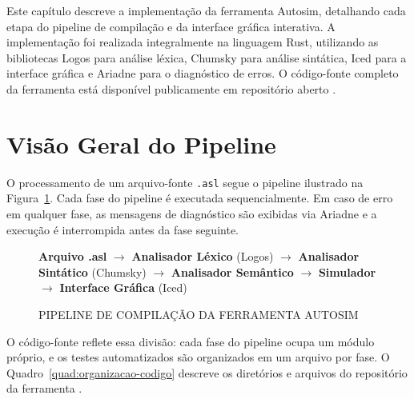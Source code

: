\documentclass[
    12pt
    ,oneside
    ,a4paper
    ,chapter=TITLE
    ,section=TITLE
    ,sumario=abnt-6027-2012]{abntex2}
\begin{document}
Este capítulo descreve a implementação da ferramenta Autosim, detalhando cada etapa do
pipeline de compilação e da interface gráfica interativa. A implementação foi realizada
integralmente na linguagem Rust, utilizando as bibliotecas Logos \cite{logos2021} para
análise léxica, Chumsky \cite{chumsky2022} para análise sintática, Iced \cite{iced2022}
para a interface gráfica e Ariadne \cite{ariadne2021} para o diagnóstico de erros. O código-fonte completo
da ferramenta está disponível publicamente em repositório aberto \cite{autosim2026}.

\section{Visão Geral do Pipeline}
\label{sec:impl-pipeline}

O processamento de um arquivo-fonte \texttt{.asl} segue o pipeline ilustrado na
Figura~\ref{fig:pipeline-autosim}. Cada fase do pipeline é executada sequencialmente.
Em caso de erro em qualquer fase, as mensagens de diagnóstico são exibidas via
Ariadne e a execução é interrompida antes da fase seguinte.

\begin{figure}[h]
    \centering
    \caption{PIPELINE DE COMPILAÇÃO DA FERRAMENTA AUTOSIM}
    \label{fig:pipeline-autosim}
    \textbf{Arquivo .asl} $\to$ \textbf{Analisador Léxico} (Logos) $\to$ \textbf{Analisador Sintático} (Chumsky) $\to$ \textbf{Analisador Semântico} $\to$ \textbf{Simulador} $\to$ \textbf{Interface Gráfica} (Iced)
\end{figure}

O código-fonte reflete essa divisão: cada fase do pipeline ocupa um módulo próprio, e os
testes automatizados são organizados em um arquivo por fase. O
Quadro~\ref{quad:organizacao-codigo} descreve os diretórios e arquivos do repositório da
ferramenta \cite{autosim2026}.
\end{document}
